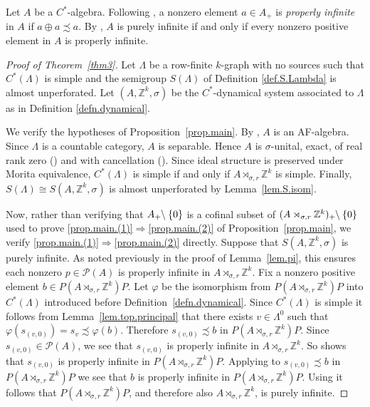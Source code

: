 \documentclass[a4paper, 12pt]{amsart}
\numberwithin{equation}{section}
\theoremstyle{remark}
\theoremstyle{definition}
\begin{document}
Let $A$ be a $C^*$-algebra. Following \cite{MR1759891}, a nonzero element $a\in A_+$ is
\emph{properly infinite} in $A$ if $a\oplus a \precsim a$. By
\cite[Theorem~4.16]{MR1759891}, $A$ is purely infinite if and only if every nonzero
positive element in $A$ is properly infinite.

\begin{proof}[Proof of Theorem~\ref{thm3}] Let $\Lambda$ be a row-finite $k$-graph with no
sources such that $C^*(\Lambda)$ is simple and the semigroup $S(\Lambda)$ of Definition
\ref{def.S.Lambda} is almost unperforated. Let $(A,{\mathbb{Z}}^k,\sigma)$ be the $C^*$-dynamical
system associated to $\Lambda$ as in Definition \ref{defn.dynamical}.

We verify the hypotheses of Proposition~\ref{prop.main}. By
\cite[Theorem~5.5]{MR1745529}, $A$ is an AF-algebra. Since $\Lambda$ is a countable
category, $A$ is separable. Hence $A$ is $\sigma$-unital, exact, of real rank zero
(\cite[p.~140]{MR1120918}) and with cancellation (\cite[p.~131]{MR1783408}).  Since
ideal structure is preserved under Morita equivalence,  $C^*(\Lambda)$ is simple if and
only if $A\rtimes_{\sigma,r} {\mathbb{Z}}^k$ is simple. Finally, $S(\Lambda)\cong
S(A,{\mathbb{Z}}^k,\sigma)$ is almost unperforated by Lemma~\ref{lem.S.isom}.

Now, rather than verifying that $A_+{\negthickspace}\setminus\{0\}$ is a cofinal subset of
$(A\rtimes_{\sigma,r} {\mathbb{Z}}^k)_+{\negthickspace}\setminus\{0\}$ used to prove
\eqref{prop.main.(1)}$\Rightarrow$\eqref{prop.main.(2)} of Proposition~\ref{prop.main}, we verify \eqref{prop.main.(1)}$\Rightarrow$\eqref{prop.main.(2)}
directly. Suppose that $S(A,{\mathbb{Z}}^k,\sigma)$ is purely infinite. As noted previously in the
proof of Lemma~\ref{lem.pi}, this ensures each nonzero $p\in {\mathcal{P}}(A)$ is properly infinite
in $A\rtimes_{\sigma,r} {\mathbb{Z}}^k$. Fix a nonzero positive element $b\in
P(A\rtimes_{\sigma,r} {\mathbb{Z}}^k)P$. Let $\varphi$ be the isomorphism   from
$P(A\rtimes_{\sigma,r} {\mathbb{Z}}^k)P$ into $C^*(\Lambda)$ introduced before
Definition~\ref{defn.dynamical}. Since $C^*(\Lambda)$ is simple it follows from
Lemma~\ref{lem.top.principal} that there exists $v\in \Lambda^0$ such that
$\varphi(s_{(v,0)})=s_v\precsim \varphi(b)$. Therefore $s_{(v,0)} \precsim b$ in
$P(A\rtimes_{\sigma,r} {\mathbb{Z}}^k)P$. Since $s_{(v,0)}\in {\mathcal{P}}(A)$, we see that $s_{(v,0)}$ is properly
infinite in $A\rtimes_{\sigma,r} {\mathbb{Z}}^k$. So  \cite[Lemma~2.2]{MR1759891} shows that $s_{(v,0)}$ is
properly infinite in $P(A\rtimes_{\sigma,r} {\mathbb{Z}}^k)P$. Applying
\cite[Lemma~3.8]{MR1759891} to $s_{(v,0)}\precsim b$ in  $P(A\rtimes_{\sigma,r} {\mathbb{Z}}^k)P$
we see that $b$ is properly infinite in $P(A\rtimes_{\sigma,r} {\mathbb{Z}}^k)P$. Using
\cite[Theorem~4.16]{MR1759891} it follows that $P(A\rtimes_{\sigma,r} {\mathbb{Z}}^k)P$, and
therefore also $A\rtimes_{\sigma,r} {\mathbb{Z}}^k$, is purely infinite.


\end{proof}
\end{document}
